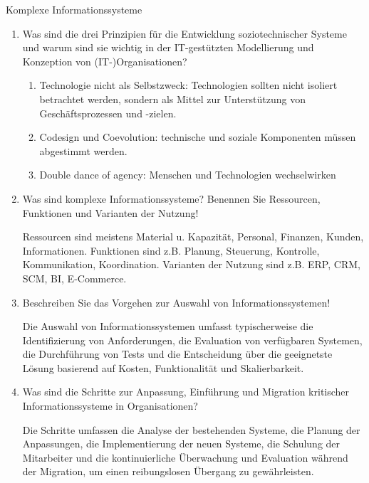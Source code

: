 \documentclass{article}
\begin{document}
\begin{exercise}{Komplexe Informationssysteme}
  \begin{enumerate}
    \item Was sind die drei Prinzipien für die Entwicklung soziotechnischer Systeme und warum sind sie wichtig in der IT-gestützten Modellierung und Konzeption von (IT-)Organisationen?
          \begin{solution}
            \begin{enumerate}
              \item Technologie nicht als Selbstzweck: Technologien sollten nicht isoliert betrachtet werden, sondern als Mittel zur Unterstützung von Geschäftsprozessen und -zielen.
              \item Codesign und Coevolution: technische und soziale Komponenten müssen abgestimmt werden.
              \item Double dance of agency: Menschen und Technologien wechselwirken
            \end{enumerate}
          \end{solution}

    \item Was sind komplexe Informationssysteme? Benennen Sie Ressourcen, Funktionen und Varianten der Nutzung!
          \begin{solution}
            Ressourcen sind meistens Material u. Kapazität, Personal, Finanzen, Kunden, Informationen. Funktionen sind z.B. Planung, Steuerung, Kontrolle, Kommunikation, Koordination. Varianten der Nutzung sind z.B. ERP, CRM, SCM, BI, E-Commerce.
          \end{solution}

    \item Beschreiben Sie das Vorgehen zur Auswahl von Informationssystemen!
          \begin{solution}
            Die Auswahl von Informationssystemen umfasst typischerweise die Identifizierung von Anforderungen, die Evaluation von verfügbaren Systemen, die Durchführung von Tests und die Entscheidung über die geeignetste Lösung basierend auf Kosten, Funktionalität und Skalierbarkeit.
          \end{solution}

    \item Was sind die Schritte zur Anpassung, Einführung und Migration kritischer Informationssysteme in Organisationen?
          \begin{solution}
            Die Schritte umfassen die Analyse der bestehenden Systeme, die Planung der Anpassungen, die Implementierung der neuen Systeme, die Schulung der Mitarbeiter und die kontinuierliche Überwachung und Evaluation während der Migration, um einen reibungslosen Übergang zu gewährleisten.
          \end{solution}


\end{enumerate}
\end{exercise}
\end{document}
